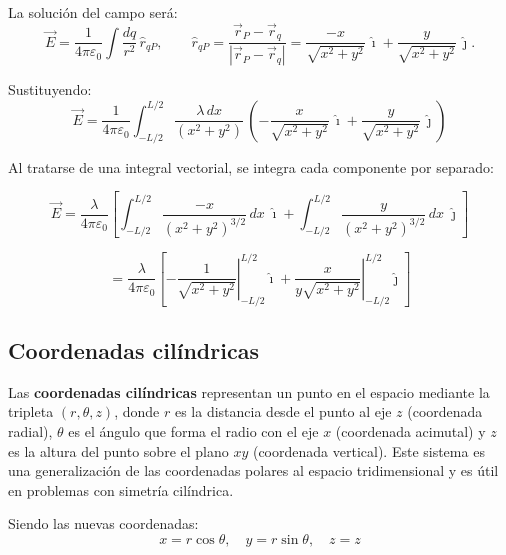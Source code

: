 \documentclass[a4paper,12pt]{article}
\begin{document}
La solución del campo será:
\[
\vec E = \frac{1}{4\pi\varepsilon_0} \int \frac{dq}{r^2}\,\hat r_{qP},
\qquad
\hat r_{qP} = \frac{\vec r_P-\vec r_q}{|\vec r_P-\vec r_q|}
= \frac{-x}{\sqrt{x^2+y^2}}\,\hat{\imath} + \frac{y}{\sqrt{x^2+y^2}}\,\hat{\jmath}.
\]

Sustituyendo:
\[
\vec E = \frac{1}{4\pi\varepsilon_0} \int_{-L/2}^{L/2}
\frac{\lambda\,dx}{(x^2+y^2)}\,
\left( -\frac{x}{\sqrt{x^2+y^2}}\,\hat{\imath}
+ \frac{y}{\sqrt{x^2+y^2}}\,\hat{\jmath} \right)
\]

Al tratarse de una integral vectorial, se integra cada componente por separado:

\[
\vec E =
\frac{\lambda}{4\pi\varepsilon_0} \left[
\int_{-L/2}^{L/2} \frac{-x}{(x^2+y^2)^{3/2}}\,dx \;\hat{\imath}
+ \int_{-L/2}^{L/2} \frac{y}{(x^2+y^2)^{3/2}}\,dx \;\hat{\jmath}
\right]
\]

\[
= \frac{\lambda}{4\pi\varepsilon_0} \left[
\left. -\frac{1}{\sqrt{x^2+y^2}} \right|_{-L/2}^{L/2} \hat{\imath}
+ \left. \frac{x}{y\sqrt{x^2+y^2}} \right|_{-L/2}^{L/2} \hat{\jmath}
\right]
\]


\newpage
\subsection*{Coordenadas cilíndricas}

Las \textbf{coordenadas cilíndricas} representan un punto en el espacio mediante la tripleta
 $(r,\theta,z)$, donde $r$ es la distancia desde el punto al eje $z$ (coordenada radial),
  $\theta$ es el ángulo que forma el radio con el eje $x$ (coordenada acimutal) y $z$ es la
   altura del punto sobre el plano $xy$ (coordenada vertical). Este sistema es una generalización
    de las coordenadas polares al espacio tridimensional y es útil en problemas con simetría cilíndrica.

Siendo las nuevas coordenadas:
\[
x = r\cos\theta, \quad y = r\sin\theta, \quad z = z
\]

\begin{center}
\hspace{2cm}
\end{center}
\end{document}
